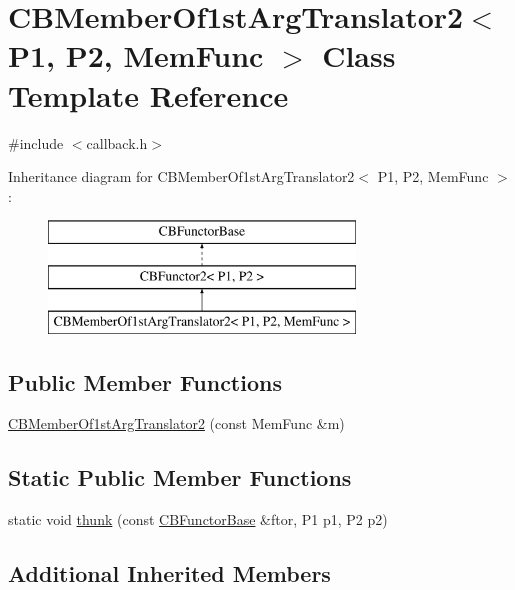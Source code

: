 \hypertarget{class_c_b_member_of1st_arg_translator2}{\section{C\+B\+Member\+Of1st\+Arg\+Translator2$<$ P1, P2, Mem\+Func $>$ Class Template Reference}
\label{class_c_b_member_of1st_arg_translator2}
}


{\ttfamily \#include $<$callback.\+h$>$}

Inheritance diagram for C\+B\+Member\+Of1st\+Arg\+Translator2$<$ P1, P2, Mem\+Func $>$\+:\begin{figure}[H]
\begin{center}
\leavevmode
\includegraphics[height=3.000000cm]{class_c_b_member_of1st_arg_translator2}
\end{center}
\end{figure}
\subsection*{Public Member Functions}
\begin{DoxyCompactItemize}
\item 
\hyperlink{class_c_b_member_of1st_arg_translator2_a023911cf50561084aba2161ee7c62833}{C\+B\+Member\+Of1st\+Arg\+Translator2} (const Mem\+Func \&m)
\end{DoxyCompactItemize}
\subsection*{Static Public Member Functions}
\begin{DoxyCompactItemize}
\item 
static void \hyperlink{class_c_b_member_of1st_arg_translator2_a19f52a3dbdd607f7ecd1a9096579a22e}{thunk} (const \hyperlink{class_c_b_functor_base}{C\+B\+Functor\+Base} \&ftor, P1 p1, P2 p2)
\end{DoxyCompactItemize}
\subsection*{Additional Inherited Members}


